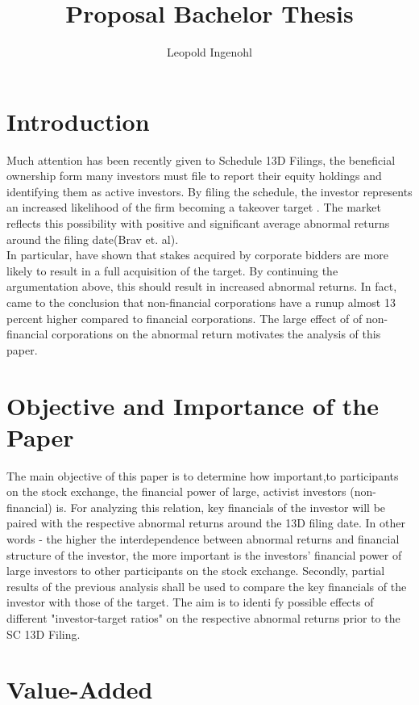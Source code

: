\documentclass[11pt,openright]{article}
\title{Proposal Bachelor Thesis}
\author{Leopold Ingenohl}
\begin{document}
\maketitle

\section{Introduction}
Much attention has been recently given to Schedule 13D Filings, the beneficial ownership form many investors must file to report their equity holdings \citep{Giglia2018} and identifying them as active investors. By filing the schedule, the investor represents an increased likelihood of the firm becoming a takeover target \citep{Brigida2012}. The market reflects this possibility with positive and significant average abnormal returns around the filing date(Brav et. al). \\
In particular, \citet{Akhigbe2007} have shown that stakes acquired by corporate bidders are more likely to result in a full acquisition of the target. By continuing the argumentation above, this should result in increased abnormal returns.  In fact, \citet{Brigida2012} came to the conclusion that non-financial corporations have a runup  almost 13 percent higher compared to financial corporations. The large effect of of non-financial corporations on the abnormal return motivates the analysis of this paper.


\section{Objective and Importance of the Paper}
The main objective of this paper is to determine how important,to participants on the stock exchange, the financial power of large, activist investors (non-financial) is. For analyzing this relation, key financials of the investor will be paired with the respective abnormal returns around the 13D filing date. In other words - the higher the interdependence between abnormal returns and financial structure of the investor, the more important is the investors' financial power of large investors to other participants on the stock exchange.
Secondly, partial results of the previous analysis shall be used to compare the key financials of the investor with those of the target. The aim is to identi fy possible effects of different "investor-target ratios" on the respective abnormal returns prior to the SC 13D Filing. 

\section{Value-Added}
\end{document}

